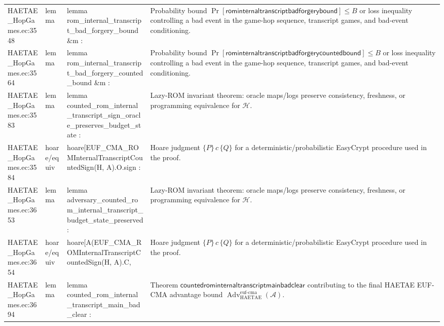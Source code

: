 \documentclass[10pt]{article}
\newcommand{\Adv}{\operatorname{Adv}}
\begin{document}
\begin{longtable}{L{0.11\textwidth}L{0.055\textwidth}L{0.385\textwidth}L{0.41\textwidth}}
HAETAE\_\allowbreak{}HopGames.\allowbreak{}ec:\allowbreak{}3548 & lemma & {\ttfamily\scriptsize lemma rom\_\allowbreak{}internal\_\allowbreak{}transcript\_\allowbreak{}bad\_\allowbreak{}forgery\_\allowbreak{}bound \&m :} & Probability bound $\Pr[\mathsf{rominternaltranscriptbadforgerybound}]\le B$ or loss inequality controlling a bad event in the game-hop sequence, transcript games, and bad-event conditioning. \\
HAETAE\_\allowbreak{}HopGames.\allowbreak{}ec:\allowbreak{}3564 & lemma & {\ttfamily\scriptsize lemma rom\_\allowbreak{}internal\_\allowbreak{}transcript\_\allowbreak{}bad\_\allowbreak{}forgery\_\allowbreak{}counted\_\allowbreak{}bound \&m :} & Probability bound $\Pr[\mathsf{rominternaltranscriptbadforgerycountedbound}]\le B$ or loss inequality controlling a bad event in the game-hop sequence, transcript games, and bad-event conditioning. \\
HAETAE\_\allowbreak{}HopGames.\allowbreak{}ec:\allowbreak{}3583 & lemma & {\ttfamily\scriptsize lemma counted\_\allowbreak{}rom\_\allowbreak{}internal\_\allowbreak{}transcript\_\allowbreak{}sign\_\allowbreak{}oracle\_\allowbreak{}preserves\_\allowbreak{}budget\_\allowbreak{}state :} & Lazy-ROM invariant theorem: oracle maps/logs preserve consistency, freshness, or programming equivalence for $\mathcal H$. \\
HAETAE\_\allowbreak{}HopGames.\allowbreak{}ec:\allowbreak{}3584 & hoare/equiv & {\ttfamily\scriptsize hoare[EUF\_\allowbreak{}CMA\_\allowbreak{}ROMInternalTranscriptCountedSign(H, A).O.sign :} & Hoare judgment $\{P\}\,c\,\{Q\}$ for a deterministic/probabilistic EasyCrypt procedure used in the proof. \\
HAETAE\_\allowbreak{}HopGames.\allowbreak{}ec:\allowbreak{}3653 & lemma & {\ttfamily\scriptsize lemma adversary\_\allowbreak{}counted\_\allowbreak{}rom\_\allowbreak{}internal\_\allowbreak{}transcript\_\allowbreak{}budget\_\allowbreak{}state\_\allowbreak{}preserved :} & Lazy-ROM invariant theorem: oracle maps/logs preserve consistency, freshness, or programming equivalence for $\mathcal H$. \\
HAETAE\_\allowbreak{}HopGames.\allowbreak{}ec:\allowbreak{}3654 & hoare/equiv & {\ttfamily\scriptsize hoare[A(EUF\_\allowbreak{}CMA\_\allowbreak{}ROMInternalTranscriptCountedSign(H, A).C,} & Hoare judgment $\{P\}\,c\,\{Q\}$ for a deterministic/probabilistic EasyCrypt procedure used in the proof. \\
HAETAE\_\allowbreak{}HopGames.\allowbreak{}ec:\allowbreak{}3694 & lemma & {\ttfamily\scriptsize lemma counted\_\allowbreak{}rom\_\allowbreak{}internal\_\allowbreak{}transcript\_\allowbreak{}main\_\allowbreak{}bad\_\allowbreak{}clear :} & Theorem $\mathsf{countedrominternaltranscriptmainbadclear}$ contributing to the final HAETAE EUF-CMA advantage bound $\Adv_{\mathrm{HAETAE}}^{\mathrm{euf\mbox{-}cma}}(\mathcal A)$. \\

\end{longtable}
\end{document}
